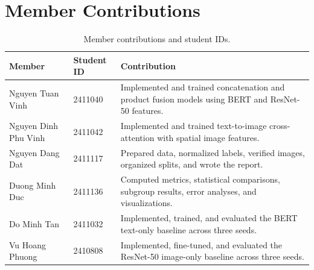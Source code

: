 \documentclass[11pt,a4paper]{article}
\begin{document}
\clearpage
\appendix
\section{Member Contributions}
\label{sec:appendix}

\begin{table}[h]
\centering
\small
\begin{tabular}{>{\raggedright\arraybackslash}p{4.2cm}l>{\raggedright\arraybackslash}p{8cm}}
\toprule
\textbf{Member} & \textbf{Student ID} & \textbf{Contribution} \\
\midrule
Nguyen Tuan Vinh & 2411040 & Implemented and trained concatenation and product fusion models using BERT and ResNet-50 features. \\
Nguyen Dinh Phu Vinh & 2411042 & Implemented and trained text-to-image cross-attention with spatial image features. \\
Nguyen Dang Dat & 2411117 & Prepared data, normalized labels, verified images, organized splits, and wrote the report. \\
Duong Minh Duc & 2411136 & Computed metrics, statistical comparisons, subgroup results, error analyses, and visualizations. \\
Do Minh Tan & 2411032 & Implemented, trained, and evaluated the BERT text-only baseline across three seeds. \\
Vu Hoang Phuong & 2410808 & Implemented, fine-tuned, and evaluated the ResNet-50 image-only baseline across three seeds. \\
\bottomrule
\end{tabular}
\caption{Member contributions and student IDs.}
\label{tab:contributions}
\end{table}
\end{document}
